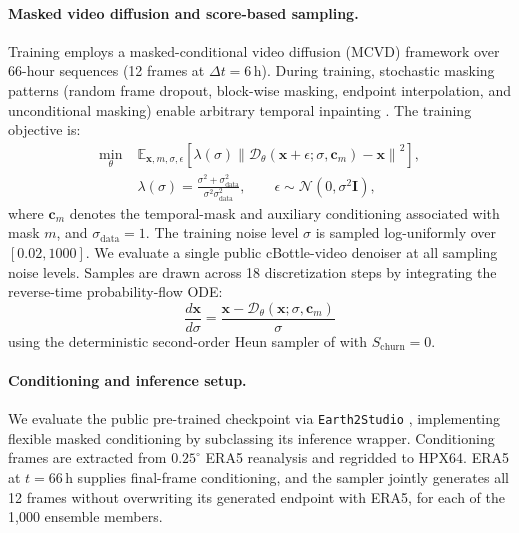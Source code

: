 \documentclass{article}
\begin{document}
\paragraph{Masked video diffusion and score-based sampling.}
Training employs a masked-conditional video diffusion (MCVD) framework \citep{voleti2022MCVD} over 66-hour sequences (12 frames at $\Delta t = 6\,\text{h}$). During training, stochastic masking patterns (random frame dropout, block-wise masking, endpoint interpolation, and unconditional masking) enable arbitrary temporal inpainting
\citep{Brenowitz2025-mz}. The training objective is:
\begin{equation}
\label{eq:cbottle_training_objective}
\begin{aligned}
\min_{\theta}\; &\mathbb{E}_{\mathbf{x},m,\sigma,\epsilon}\left[\lambda(\sigma)
\left\|\mathcal{D}_\theta(\mathbf{x} + \epsilon; \sigma, \mathbf{c}_m) - \mathbf{x}\right\|^2\right],\\
&\lambda(\sigma) = \frac{\sigma^2 + \sigma_{\text{data}}^2}{\sigma^2\sigma_{\text{data}}^2},
\qquad \epsilon \sim \mathcal{N}(0, \sigma^2 \mathbf{I}),
\end{aligned}
\end{equation}
where $\mathbf{c}_m$ denotes the temporal-mask and auxiliary conditioning associated with mask $m$, and $\sigma_{\text{data}} = 1$. The training noise level $\sigma$ is sampled log-uniformly over $[0.02, 1000]$. We evaluate a single public cBottle-video denoiser at all sampling noise levels. Samples are drawn across 18 discretization steps by integrating the reverse-time probability-flow ODE:
\begin{equation}
\label{eq:cbottle_sampling_step}
\frac{d\mathbf{x}}{d\sigma} = \frac{\mathbf{x} - \mathcal{D}_\theta(\mathbf{x}; \sigma, \mathbf{c}_m)}{\sigma}
\end{equation}
using the deterministic second-order Heun sampler of \citet{Karras2022-xq} with $S_{\text{churn}} = 0$.

\paragraph{Conditioning and inference setup.}
We evaluate the public pre-trained checkpoint \citep{Brenowitz2025-mz} via \texttt{Earth2Studio} \citep{Earth2Studio_Contributors_NVIDIA_Earth2Studio_2024}, implementing
flexible masked conditioning by subclassing its inference wrapper. Conditioning frames are extracted from $0.25^\circ$ ERA5 reanalysis \citep{Hersbach2020-oh} and regridded to HPX64. ERA5 at $t=66\,\text{h}$ supplies final-frame conditioning, and the sampler jointly generates all 12 frames without overwriting its generated endpoint with ERA5, for each of the 1,000 ensemble members.
\end{document}
